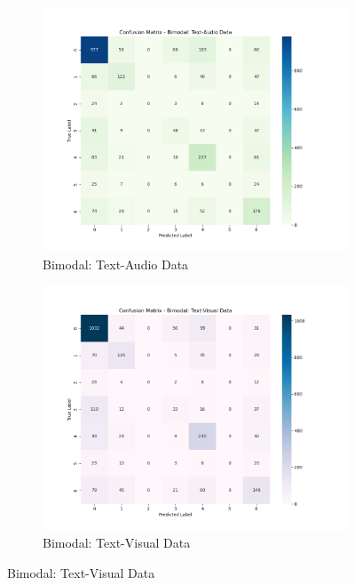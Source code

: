 \begin{figure}[htbp]
    \vspace{0.5cm} %

    \begin{subfigure}[b]{0.45\textwidth}
        \centering
        \includegraphics[width=\textwidth]{figures/text-audio.png}
        \caption{Bimodal: Text-Audio Data}
    \end{subfigure}
    \hfill
    \begin{subfigure}[b]{0.45\textwidth}
        \centering
        \includegraphics[width=\textwidth]{figures/text-visual.png}
        \caption{Bimodal: Text-Visual Data}
    \end{subfigure}


\end{figure}
